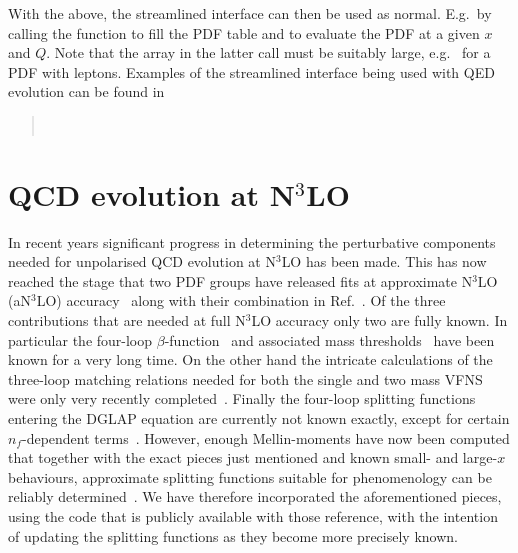 With the above, the streamlined interface can then be used as normal.
%
E.g.\ by calling the  function to fill the PDF
table and  to evaluate the PDF at a given $x$
and $Q$.
%
Note that the  array in the latter call must be
suitably large, e.g.\  for a PDF with leptons.
%
Examples of the streamlined interface being used with QED evolution
can be found in
\begin{quote}
  \\
\end{quote}

\section{QCD evolution at N$^3$LO}
\label{sec:n3lo-evolution}
In recent years significant progress in determining the perturbative
components needed for unpolarised QCD evolution at N$^3$LO has been
made.
%
This has now reached the stage that two PDF groups have released fits
at approximate N$^3$LO (aN$^3$LO)
accuracy~\cite{McGowan:2022nag,NNPDF:2024nan} along with their
combination in Ref.~\cite{MSHT:2024tdn}.
%
Of the three contributions that are needed at full N$^3$LO accuracy
only two are fully known.
%
In particular the four-loop
$\beta$-function~\cite{vanRitbergen:1997va,Czakon:2004bu} and
associated mass thresholds~\cite{Chetyrkin:1997sg} have been known for
a very long time.
%
On the other hand the intricate calculations of the three-loop
matching relations needed for both the single and two mass VFNS were
only very recently
completed~\cite{Bierenbaum:2009mv,Ablinger:2010ty,Kawamura:2012cr,Blumlein:2012vq,ABLINGER2014263,Ablinger:2014nga,Ablinger:2014vwa,Behring:2014eya,Ablinger:2019etw,Behring:2021asx,Ablinger:2023ahe,Ablinger:2024xtt}.
%
Finally the four-loop splitting functions entering the DGLAP equation
are currently not known exactly, except for certain $n_f$-dependent
terms~\cite{Gracey:1994nn,Davies:2016jie,Moch:2017uml,Gehrmann:2023cqm,Falcioni:2023tzp,Gehrmann:2023iah}.
%
However, enough Mellin-moments have now been computed that together
with the exact pieces just mentioned and known small- and large-$x$
behaviours, approximate splitting functions suitable for phenomenology
can be reliably
determined~\cite{McGowan:2022nag,NNPDF:2024nan,Moch:2021qrk,Falcioni:2023luc,Falcioni:2023vqq,Moch:2023tdj,Falcioni:2024xyt,Falcioni:2024qpd}.
%
We have therefore incorporated the aforementioned pieces, using the
code that is publicly available with those reference, with the
intention of updating the splitting functions as they become more
precisely known.

